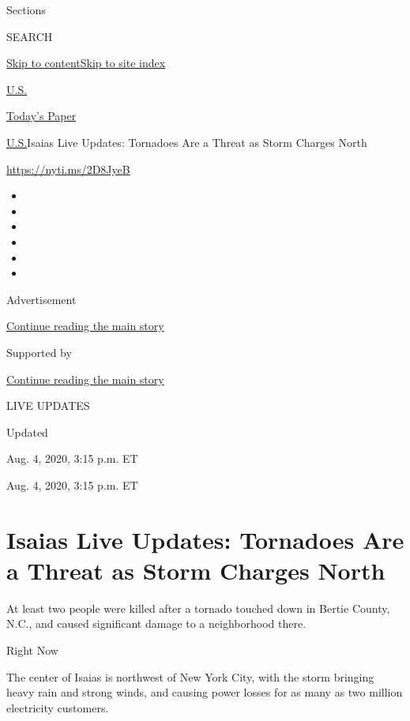 Sections

SEARCH

\protect\hyperlink{site-content}{Skip to
content}\protect\hyperlink{site-index}{Skip to site index}

\href{https://www.nytimes3xbfgragh.onion/section/us}{U.S.}

\href{https://myaccount.nytimes3xbfgragh.onion/auth/login?response_type=cookie\&client_id=vi}{}

\href{https://www.nytimes3xbfgragh.onion/section/todayspaper}{Today's
Paper}

\href{/section/us}{U.S.}\textbar{}Isaias Live Updates: Tornadoes Are a
Threat as Storm Charges North

\url{https://nyti.ms/2D8JyeB}

\begin{itemize}
\item
\item
\item
\item
\item
\item
\end{itemize}

Advertisement

\protect\hyperlink{after-top}{Continue reading the main story}

Supported by

\protect\hyperlink{after-sponsor}{Continue reading the main story}

LIVE UPDATES

Updated~

Aug. 4, 2020, 3:15 p.m. ET

Aug. 4, 2020, 3:15 p.m. ET

\hypertarget{isaias-live-updates-tornadoes-are-a-threat-as-storm-charges-north}{%
\section{Isaias Live Updates: Tornadoes Are a Threat as Storm Charges
North}\label{isaias-live-updates-tornadoes-are-a-threat-as-storm-charges-north}}

At least two people were killed after a tornado touched down in Bertie
County, N.C., and caused significant damage to a neighborhood there.

Right Now

The center of Isaias is northwest of New York City, with the storm
bringing heavy rain and strong winds, and causing power losses for as
many as two million electricity customers.

